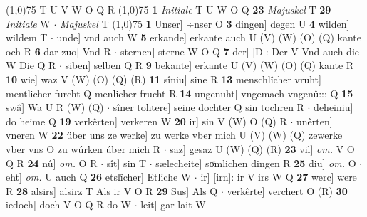 \documentclass[8pt,a4paper,notitlepage]{article}
\begin{document}
\begin{table}[ht]
\begin{minipage}[t]{0.5\linewidth}
\begin{tabular}{rl}
\end{tabular}
\scriptsize
\line(1,0){75} \newline
T U V W O Q R \newline
\line(1,0){75} \newline
\textbf{1} \textit{Initiale} T U W O Q  \textbf{23} \textit{Majuskel} T  \textbf{29} \textit{Initiale} W   $\cdot$ \textit{Majuskel} T  \newline
\line(1,0){75} \newline
\textbf{1} Unser] ÷nser O \textbf{3} dingen] degen U \textbf{4} wilden] wildem T  $\cdot$ unde] vnd auch W \textbf{5} erkande] erkante auch U (V) (W) (O) (Q) kante och R \textbf{6} dar zuo] Vnd R  $\cdot$ sternen] sterne W O Q \textbf{7} der] [D]: Der V Vnd auch die W Die Q R  $\cdot$ siben] selben Q R \textbf{9} bekante] erkante U (V) (W) (O) (Q) kante R \textbf{10} wie] waz V (W) (O) (Q) (R) \textbf{11} sîniu] sine R \textbf{13} menschlîcher vruht] mentlicher furcht Q menlicher frucht R \textbf{14} ungenuht] vngemach vngenû::: Q \textbf{15} swâ] Wa U R (W) (Q)  $\cdot$ sîner tohtere] seine dochter Q sin tochren R  $\cdot$ deheiniu] do heime Q \textbf{19} verkêrten] verkeren W \textbf{20} ir] sin V (W) O (Q) R  $\cdot$ unêrten] vneren W \textbf{22} über uns ze werke] zu werke vber mich U (V) (W) (Q) zewerke vber vns O zu wúrken úber mich R  $\cdot$ saz] gesaz U (W) (Q) (R) \textbf{23} vil] \textit{om.} V O Q R \textbf{24} nû] \textit{om.} O R  $\cdot$ sît] sin T  $\cdot$ sælecheite] soͯmlichen dingen R \textbf{25} diu] \textit{om.} O  $\cdot$ eht] \textit{om.} U auch Q \textbf{26} etslîcher] Etliche W  $\cdot$ ir] [irn]: ir V irs W Q \textbf{27} werc] were R \textbf{28} alsirs] alsirz T Als ir V O R \textbf{29} Sus] Als Q  $\cdot$ verkêrte] verchert O (R) \textbf{30} iedoch] doch V O Q R do W  $\cdot$ leit] gar lait W \newline
\end{minipage}
\end{table}
\end{document}
